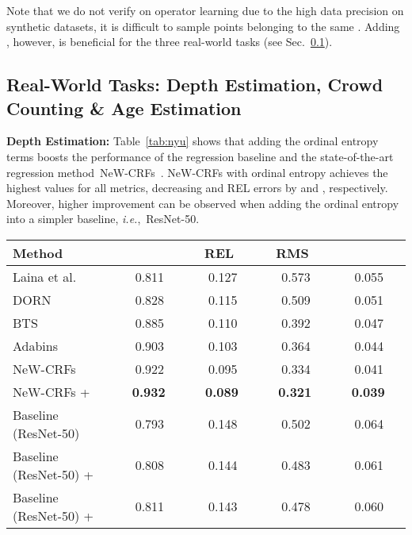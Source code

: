 \documentclass{article} \usepackage{iclr2023_conference,times}
\makeatletter
\newcommand*{\ie}{i.e.\@\xspace}
\def\ie{\mbox{\textit{i.e.}, }}
\makeatother
\begin{document}
Note that we do not verify  on operator learning due to the 
high data precision on synthetic datasets, it is difficult to sample points belonging to the same . Adding , however, is beneficial for the three real-world tasks (see Sec.~\ref{subsection_depth}).  

\subsection{Real-World Tasks: Depth Estimation, Crowd Counting \& Age Estimation}
\label{subsection_depth}

\textbf{Depth Estimation:} 
Table~\ref{tab:nyu} shows that adding the ordinal entropy terms boosts the performance of the regression baseline and the state-of-the-art regression method~NeW-CRFs~\citep{yuan2022new}.  NeW-CRFs with ordinal entropy achieves the highest values for all metrics, decreasing  and REL errors by  and , respectively.
Moreover, higher improvement can be observed when adding the ordinal entropy into a simpler baseline, \ie ResNet-50.


\begin{table*}[t]
	\caption{{Quantitative comparison} of depth estimation results with NYU-Depth-v2. \textbf{Bold} numbers indicate the best performance.}
	\label{tab:nyu}
	\centering
		\begin{tabular}{l|cccc}
			\hline
			\multirow{1}[0]{*}{Method}
			& ~ & REL~ & RMS~ & ~ \\
			\hline
Laina et al. \citep{laina2016deeper} & 0.811 & 0.127 & 0.573 & 0.055  \\
			DORN \citep{fu2018deep} & 0.828 & 0.115 & 0.509 & 0.051  \\
			BTS \citep{lee2019big} & 0.885  & 0.110 & 0.392 & 0.047  \\
			Adabins \citep{bhat2021adabins} & 0.903 & 0.103 & 0.364 & 0.044 \\
			\midrule
			NeW-CRFs \citep{yuan2022new} & 0.922  & 0.095 & 0.334 & 0.041 \\
			NeW-CRFs +  & ~~\bf{0.932}~~ & ~~\bf{0.089}~~ & ~~\bf{0.321}~~ &~~\bf{0.039}~~\\
			Baseline (ResNet-50) & 0.793  & 0.148 & 0.502 & 0.064\\
			Baseline (ResNet-50) +  & 0.808 & 0.144 & 0.483 & 0.061\\
			Baseline (ResNet-50) +  & {0.811} & {0.143} & {0.478} & {0.060}\\
			\hline
		\end{tabular}
\end{table*}
\end{document}

